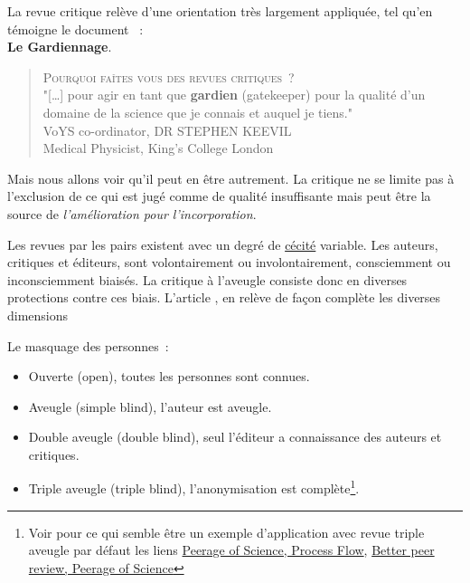 La revue critique relève d'une orientation très largement appliquée, tel qu'en témoigne le document ~:\\ \textbf{Le Gardiennage}.
\blockcquote[traduction]{voys_peer_2012}{
\textsc{Pourquoi faîtes vous des revues critiques}~?\\
"[\ldots] pour agir en tant que \textbf {gardien} (gatekeeper) pour la qualité d'un domaine de la science que je connais et auquel je tiens."\\
VoYS co-ordinator, DR STEPHEN KEEVIL\\
Medical Physicist, King’s College London
}
Mais nous allons voir qu'il peut en être autrement.
La critique ne se limite pas à l'exclusion de ce qui est jugé comme de qualité insuffisante mais peut être la source de \emph{l'amélioration pour l'incorporation}.

Les revues par les pairs existent avec un degré de \href{http://www.cnrtl.fr/lexicographie/cécité}{cécité} variable.
Les auteurs, critiques et éditeurs, sont volontairement ou involontairement, consciemment ou inconsciemment biaisés.
La critique à l'aveugle consiste donc en diverses protections contre ces biais.
L'article , en relève de façon complète les diverses dimensions~\cite{wikipedia_contributors_scholarly_2016} %

Le masquage des personnes~:
\begin{itemize}
\item Ouverte (open), toutes les personnes sont connues.
\item Aveugle (simple blind), l'auteur est aveugle.
\item Double aveugle (double blind), seul l'éditeur a connaissance des auteurs et critiques.
\item Triple aveugle (triple blind), l'anonymisation est complète\footnote{
Voir pour ce qui semble être un exemple d'application avec revue triple aveugle par défaut les liens \href{https://www.peerageofscience.org/how-it-works/process-flow/}{Peerage of Science, Process Flow},  \href{https://www.peerageofscience.org/profs-vs-postdocs-in-peer-reviewing/}{Better peer review, Peerage of Science}
}.
\end{itemize}
 

